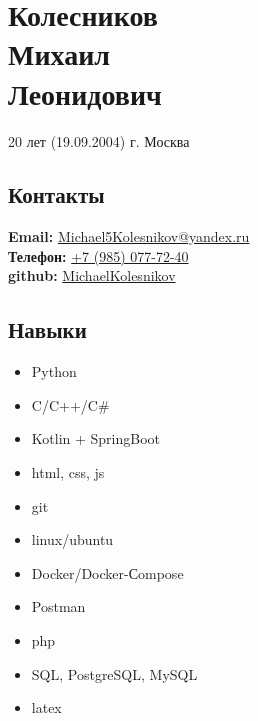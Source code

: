 \documentclass[14pt]{extarticle}
\begin{document}
\noindent
\begin{minipage}{0.35\textwidth} %
      \section*{Колесников \\ Михаил \\ Леонидович}
      20 лет (19.09.2004)
      г. Москва
      \vspace{2cm}
      \subsection*{Контакты}
      \textbf{Email:} \href{mailto:Michael5Kolesnikov@yandex.ru}{Michael5Kolesnikov@yandex.ru} \\
      \textbf{Телефон:} \href{tel:+79850777240}{+7 (985) 077-72-40} \\
      \textbf{github:} \href{https://github.com/MichaelKolesnikov}{MichaelKolesnikov} \\

      \vspace{2cm}

      \subsection*{Навыки}
      \begin{itemize}
            \item Python
            \item C/C++/C\#
            \item Kotlin + SpringBoot
            \item html, css, js
            \item git
            \item linux/ubuntu
            \item Docker/Docker-Сompose
            \item Postman
            \item php
            \item SQL, PostgreSQL, MySQL
            \item latex
      \end{itemize}

\end{minipage}
\hfill
\vline %
\hfill
\end{document}
